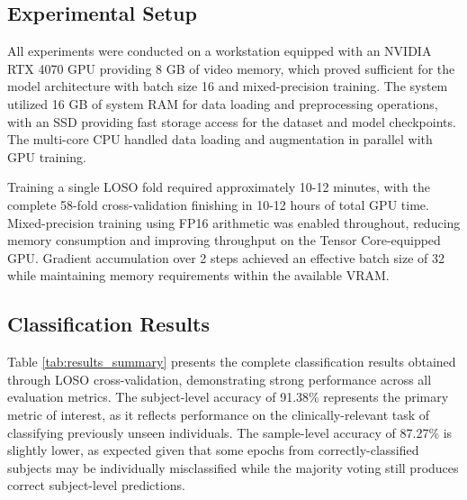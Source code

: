 \subsection{Experimental Setup}

All experiments were conducted on a workstation equipped with an NVIDIA RTX 4070 GPU providing 8 GB of video memory, which proved sufficient for the model architecture with batch size 16 and mixed-precision training. The system utilized 16 GB of system RAM for data loading and preprocessing operations, with an SSD providing fast storage access for the dataset and model checkpoints. The multi-core CPU handled data loading and augmentation in parallel with GPU training.

Training a single LOSO fold required approximately 10-12 minutes, with the complete 58-fold cross-validation finishing in 10-12 hours of total GPU time. Mixed-precision training using FP16 arithmetic was enabled throughout, reducing memory consumption and improving throughput on the Tensor Core-equipped GPU. Gradient accumulation over 2 steps achieved an effective batch size of 32 while maintaining memory requirements within the available VRAM.

\subsection{Classification Results}

Table \ref{tab:results_summary} presents the complete classification results obtained through LOSO cross-validation, demonstrating strong performance across all evaluation metrics. The subject-level accuracy of 91.38\% represents the primary metric of interest, as it reflects performance on the clinically-relevant task of classifying previously unseen individuals. The sample-level accuracy of 87.27\% is slightly lower, as expected given that some epochs from correctly-classified subjects may be individually misclassified while the majority voting still produces correct subject-level predictions.

